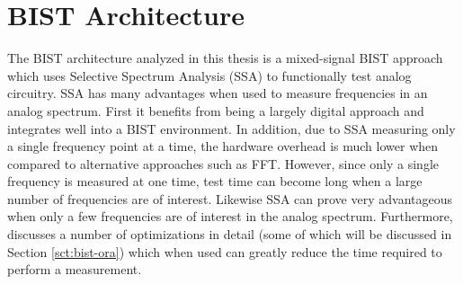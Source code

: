 \documentclass[12pt]{report}
\begin{document}
\section{BIST Architecture}
The BIST architecture analyzed in this thesis is a mixed-signal BIST approach which uses Selective Spectrum Analysis (SSA) to functionally test analog circuitry\cite{jie-journal}.  SSA has many advantages when used to measure frequencies in an analog spectrum.  First it benefits from being a largely digital approach and integrates well into a BIST environment.  In addition, due to SSA measuring only a single frequency point at a time, the hardware overhead is much lower when compared to alternative approaches such as FFT\cite{stroud-phase}. However, since only a single frequency is measured at one time, test time can become long when a large number of frequencies are of interest.  Likewise SSA can prove very advantageous when only a few frequencies are of interest in the analog spectrum\cite{jie-journal}.  Furthermore, \cite{jie} discusses a number of optimizations in detail (some of which will be discussed in Section \ref{sct:bist-ora}) which when used can greatly reduce the time required to perform a measurement.
\end{document}
